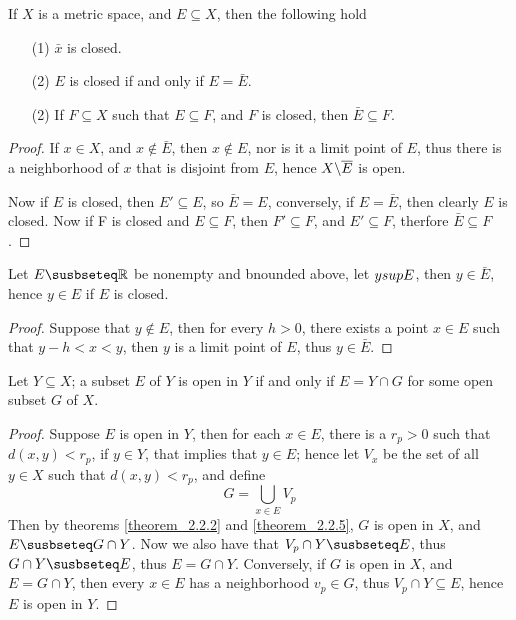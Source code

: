 \begin{theorem}\label{theorem_2.2.7}
  If $X$ is a metric space, and  $E \subseteq X$, then the following hold
  \begin{enumerate}
    \item[(1)] $\bar{x}$ is closed.

    \item[(2)] $E$ is closed if and only if $E=\bar{E}$.

    \item[(2)] If  $F \subseteq X$ such that $E \subseteq F$, and $F$ is closed,
      then $\bar{E} \subseteq F$.
  \end{enumerate}
\end{theorem}
\begin{proof}
  If $x \in X$, and  $x \notin \bar{E}$, then  $ x \notin E$, nor is it a limit
  point of  $E$, thus there is a neighborhood of $x$ that is disjoint from  $E$,
  hence  $X \backslash \overline{E}$ is open.

  Now if  $E$ is closed, then  $E' \subseteq E$, so  $\bar{E}=E$, conversely, if
  $E=\bar{E}$, then clearly  $E$ is closed. Now if  F is closed and  $E \subseteq
  F$, then $F' \subseteq F$, and $E' \subseteq F$, therfore  $\bar{E} \subseteq F$.
\end{proof}

\begin{theorem}\label{theorem_2.2.8}
  Let $E \susbseteq \R$ be nonempty and bnounded above, let  $y\\sup{E}$, then
  $y \in \bar{E}$, hence  $y \in E$ if  $E$ is closed.
\end{theorem}
\begin{proof}
  Suppose that $y \notin E$, then for every  $h>0$, there exists a point  $x \in
  E$ such that $y-h<x<y$, then  $y$ is a limit point of  $E$, thus  $y \in \bar{E}$.
\end{proof}

\begin{theorem}\label{theorem_2.2.8}
  Let $Y \subseteq X$; a subset  $E$ of  $Y$ is open in  $Y$ if and only if  $E=Y
  \cap G$ for some open subset $G$ of $X$.
\end{theorem}
\begin{proof}
  Suppose $E$ is open in  $Y$, then for each  $x \in E$, there is a $r_p>0$ such that
  $d(x,y)<r_p$, if  $y \in Y$, that implies that  $y \in E$; hence let  $V_x$ be the
  set of all  $y \in X$ such that  $d(x,y)<r_p$, and define
  \begin{equation*}
    G=\bigcup_{x \in E}{V_p}
  \end{equation*}
  Then by theorems \ref{theorem_2.2.2} and \ref{theorem_2.2.5}, $G$ is open in
  $X$, and  $E \susbseteq G \cap Y$. Now we also have that  $V_p \cap Y \susbseteq
  E$, thus  $G \cap Y \susbseteq E$, thus $E=G \cap Y$. Conversely, if  $G$ is
  open in  $X$, and $E=G \cap Y$, then every  $x \in E$ has a neighborhood  $v_p
  \in G$, thus  $V_p \cap Y \subseteq E$, hence  $E$ is open in  $Y$.
\end{proof}
